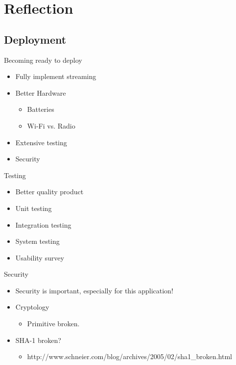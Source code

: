 

\author{Rasmus Steiniche}
\section{Reflection}

\subsection{Deployment}
\begin{frame}{Becoming ready to deploy}
\begin{itemize}
	\item Fully implement streaming
	\item Better Hardware
	\begin{itemize}
		\item Batteries
		\item Wi-Fi vs. Radio
	\end{itemize}
	\item Extensive testing
	\item Security
\end{itemize}
\end{frame}

\begin{frame}{Testing}
\begin{itemize}
	\item Better quality product
	\item Unit testing
	\item Integration testing
	\item System testing
	\item Usability survey
\end{itemize}
\end{frame}

\begin{frame}{Security}
\begin{itemize}
	\item Security is important, especially for this application!
	\item Cryptology
	\begin{itemize}
		\item Primitive broken.
	\end{itemize}
	\item SHA-1 broken?
	\begin{itemize}
		\item \tiny{http://www.schneier.com/blog/archives/2005/02/sha1\_broken.html}
	\end{itemize}
\end{itemize}
\end{frame}

